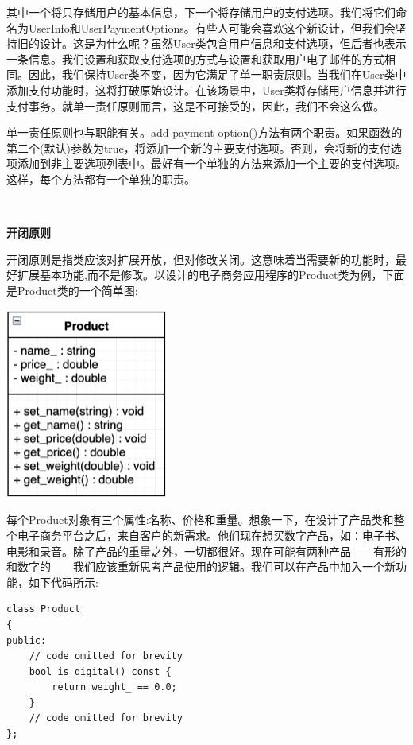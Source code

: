 其中一个将只存储用户的基本信息，下一个将存储用户的支付选项。我们将它们命名为UserInfo和UserPaymentOptions。有些人可能会喜欢这个新设计，但我们会坚持旧的设计。这是为什么呢？虽然User类包含用户信息和支付选项，但后者也表示一条信息。我们设置和获取支付选项的方式与设置和获取用户电子邮件的方式相同。因此，我们保持User类不变，因为它满足了单一职责原则。当我们在User类中添加支付功能时，这将打破原始设计。在该场景中，User类将存储用户信息并进行支付事务。就单一责任原则而言，这是不可接受的，因此，我们不会这么做。 \par
单一责任原则也与职能有关。add\underline{ }payment\underline{ }option()方法有两个职责。如果函数的第二个(默认)参数为true，将添加一个新的主要支付选项。否则，会将新的支付选项添加到非主要选项列表中。最好有一个单独的方法来添加一个主要的支付选项。这样，每个方法都有一个单独的职责。 \par

\noindent\textbf{}\ \par
\textbf{开闭原则} \ \par
开闭原则是指类应该对扩展开放，但对修改关闭。这意味着当需要新的功能时，最好扩展基本功能,而不是修改。以设计的电子商务应用程序的Product类为例，下面是Product类的一个简单图: \par

\begin{center}
	\includegraphics[width=0.4\textwidth]{content/Section-2/Chapter-10/9}
\end{center}

每个Product对象有三个属性:名称、价格和重量。想象一下，在设计了产品类和整个电子商务平台之后，来自客户的新需求。他们现在想买数字产品，如：电子书、电影和录音。除了产品的重量之外，一切都很好。现在可能有两种产品——有形的和数字的——我们应该重新思考产品使用的逻辑。我们可以在产品中加入一个新功能，如下代码所示: \par

\begin{lstlisting}[caption={}]
class Product
{
public:
	// code omitted for brevity
	bool is_digital() const {
		return weight_ == 0.0;
	}
	// code omitted for brevity
};
\end{lstlisting}


